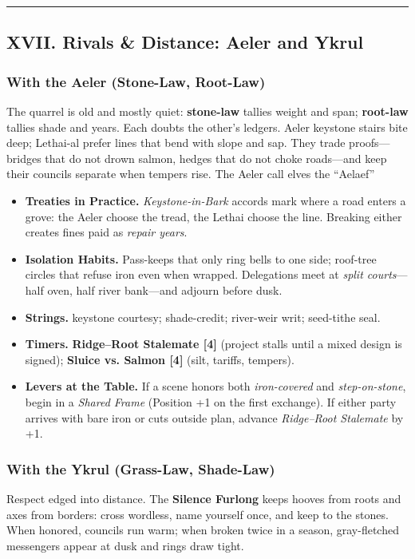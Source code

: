 \documentclass[11pt]{article}
\begin{document}
\medskip\hrule\medskip

\subsection{XVII. Rivals \& Distance: Aeler and Ykrul}

\subsubsection*{With the Aeler (Stone-Law, Root-Law)}
The quarrel is old and mostly quiet: \textbf{stone-law} tallies weight and span; \textbf{root-law} tallies shade and years. Each doubts the other's ledgers. Aeler keystone stairs bite deep; Lethai-al prefer lines that bend with slope and sap. They trade proofs---bridges that do not drown salmon, hedges that do not choke roads---and keep their councils separate when tempers rise. The Aeler call elves the ``Aelaef''

\begin{itemize}[leftmargin=*]
  \item \textbf{Treaties in Practice.} \emph{Keystone-in-Bark} accords mark where a road enters a grove: the Aeler choose the tread, the Lethai choose the line. Breaking either creates fines paid as \emph{repair years}.
  \item \textbf{Isolation Habits.} Pass-keeps that only ring bells to one side; roof-tree circles that refuse iron even when wrapped. Delegations meet at \emph{split courts}---half oven, half river bank---and adjourn before dusk.
  \item \textbf{Strings.} keystone courtesy; shade-credit; river-weir writ; seed-tithe seal.
  \item \textbf{Timers.} \textbf{Ridge--Root Stalemate [4]} (project stalls until a mixed design is signed); \textbf{Sluice vs. Salmon [4]} (silt, tariffs, tempers).
  \item \textbf{Levers at the Table.} If a scene honors both \emph{iron-covered} and \emph{step-on-stone}, begin in a \emph{Shared Frame} (Position +1 on the first exchange). If either party arrives with bare iron or cuts outside plan, advance \emph{Ridge--Root Stalemate} by +1.
\end{itemize}

\subsubsection*{With the Ykrul (Grass-Law, Shade-Law)}
Respect edged into distance. The \textbf{Silence Furlong} keeps hooves from roots and axes from borders: cross wordless, name yourself once, and keep to the stones. When honored, councils run warm; when broken twice in a season, gray-fletched messengers appear at dusk and rings draw tight.
\end{document}
